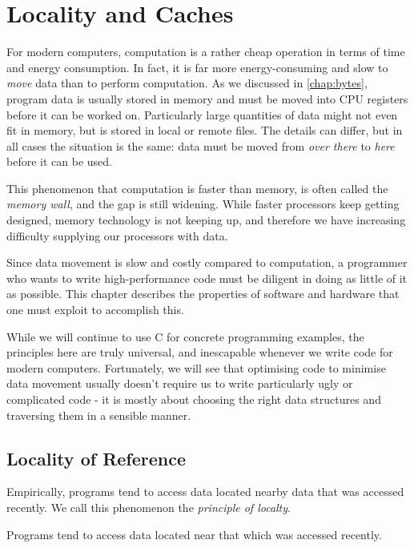 \chapter{Locality and Caches}
\label{chap:locality}

For modern computers, computation is a rather cheap operation in terms
of time and energy consumption.  In fact, it is far more
energy-consuming and slow to \emph{move} data than to perform
computation.  As we discussed in \cref{chap:bytes}, program data is
usually stored in memory and must be moved into CPU registers before
it can be worked on.  Particularly large quantities of data might not
even fit in memory, but is stored in local or remote files.  The
details can differ, but in all cases the situation is the same: data
must be moved from \emph{over there} to \emph{here} before it can be
used.

This phenomenon that computation is faster than memory, is often
called the \emph{memory wall}, and the gap is still widening.  While
faster processors keep getting designed, memory technology is not
keeping up, and therefore we have increasing difficulty supplying our
processors with data.

Since data movement is slow and costly compared to computation, a
programmer who wants to write high-performance code must be diligent
in doing as little of it as possible.  This chapter describes the
properties of software and hardware that one must exploit to
accomplish this.

While we will continue to use C for concrete programming examples, the
principles here are truly universal, and inescapable whenever we write
code for modern computers.  Fortunately, we will see that optimising
code to minimise data movement usually doesn't require us to write
particularly ugly or complicated code - it is mostly about choosing
the right data structures and traversing them in a sensible manner.

\section{Locality of Reference}

Empirically, programs tend to access data located nearby data that was
accessed recently.  We call this phenomenon the \emph{principle of
  localty}.

\begin{definition}
  Programs tend to access data located near that which was accessed
  recently.
\end{definition}

